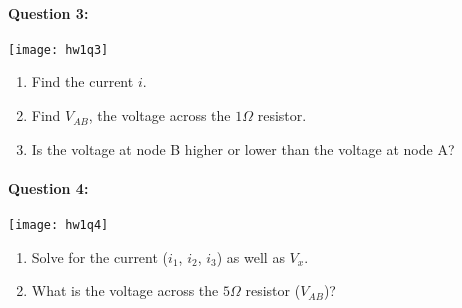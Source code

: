 \documentclass[12pt,letterpaper,titlepage]{article}
\begin{document}
\clearpage

\paragraph{Question 3: }

\begin{center}
\texttt{[image: hw1q3]}
\end{center}

\begin{enumerate}[label=\Alph*.]
\item Find the current $i$.
\item Find $V_{AB}$, the voltage across the $1 \Omega$ resistor.
\item Is the voltage at node B higher or lower than the voltage at node A?
\end{enumerate}

\clearpage

\paragraph{Question 4: }

\begin{center}
\texttt{[image: hw1q4]}
\end{center}

\begin{enumerate}[label=\Alph*.]
\item Solve for the current ($i_1$, $i_2$, $i_3$) as well as $V_x$.
\item What is the voltage across the $5 \Omega$ resistor ($V_{AB}$)?
\end{enumerate}


\begin{raggedright}



\end{raggedright}
\end{document}
